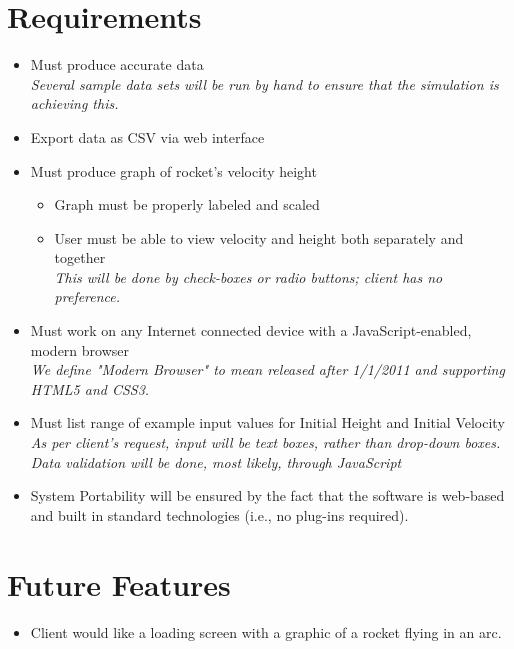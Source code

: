 \documentclass{report}
\begin{document}
\chapter{Requirements}
	\begin{itemize}
		\item Must produce accurate data\\
			\textit{Several sample data sets will be run by hand to ensure that the simulation is achieving this.}
		\item Export data as CSV via web interface
		\item Must produce graph of rocket's velocity height
			\begin{itemize}
				\item Graph must be properly labeled and scaled
				\item User must be able to view velocity and height both separately and together
				\\	  \textit{This will be done by check-boxes or radio buttons; client has no preference.}
			\end{itemize}
		\item Must work on any Internet connected device with a JavaScript-enabled, modern browser\\
				\textit{We define "Modern Browser" to mean released after 1/1/2011 and supporting HTML5 and CSS3.}
		\item Must list range of example input values for Initial Height and Initial Velocity\\
			\textit{As per client's request, input will be text boxes, rather than drop-down boxes.\\
					Data validation will be done, most likely, through JavaScript }
		\item System Portability will be ensured by the fact that the software is web-based and built in standard technologies (i.e., no plug-ins required).
	\end{itemize}
\chapter{Future Features}
	\begin{itemize}
		\item Client would like a loading screen with a graphic of a rocket flying in an arc.
	\end{itemize}
\end{document}
